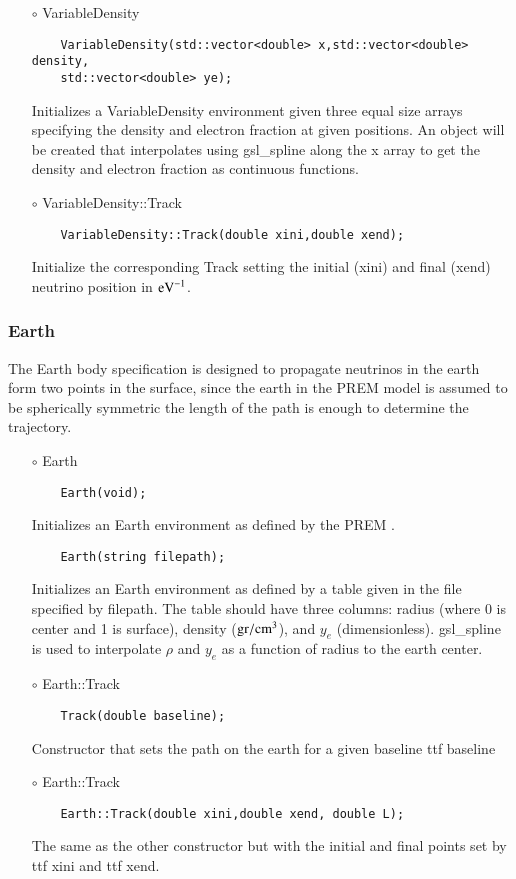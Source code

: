 \begin{itemize}
\item[$\circ$] {\ttf VariableDensity}
  \begin{lstlisting}
    VariableDensity(std::vector<double> x,std::vector<double> density,
    std::vector<double> ye);
  \end{lstlisting}
  Initializes a {\ttf VariableDensity} environment given three equal size arrays specifying the density and electron fraction at given positions. An object will be created that interpolates using {\ttfamily gsl\_spline} \citep{gough2009gnu} along the {\ttf x} array to get the density and electron fraction as continuous functions.
  \item[$\circ$] {\ttf VariableDensity::Track}
  \begin{lstlisting}
    VariableDensity::Track(double xini,double xend);
  \end{lstlisting}
  Initialize the corresponding {\ttf Track} setting the initial ({\ttf xini}) and final ({\ttf xend}) neutrino position in ${\rm eV}^{-1}$.
\end{itemize}

\subsubsection{Earth}
The {\ttf Earth} body specification is designed to propagate neutrinos
in the earth form two points in the surface, since the earth in the
PREM model is assumed to be spherically symmetric the length of the
path is enough to determine the trajectory. 
\begin{itemize}
\item[$\circ$] {\ttf Earth}
  \begin{lstlisting}
    Earth(void);
  \end{lstlisting}
  Initializes an {\ttf Earth} environment as defined by the PREM \citep{dziewonski1981preliminary}.
  \begin{lstlisting}
    Earth(string filepath);
  \end{lstlisting}
  Initializes an {\ttf Earth} environment as defined by a table given in the file specified by {\ttf filepath}. The table should have three columns: radius (where 0 is center and 1 is surface), density (${\rm gr}/{\rm cm}^3$), and $y_e$ (dimensionless). {\ttfamily gsl\_spline} \citep{gough2009gnu} is used to interpolate $\rho$ and $y_e$ as a function of radius to the earth center.
\item[$\circ$] {\ttf Earth::Track}
  \begin{lstlisting}
    Track(double baseline);
  \end{lstlisting}
  Constructor that sets the path on the earth for a given baseline
  {ttf baseline}
\item[$\circ$] {\ttf Earth::Track}
  \begin{lstlisting}
    Earth::Track(double xini,double xend, double L);
  \end{lstlisting}
  The same as the other constructor but with the initial and final points set by
  {ttf xini} and {ttf xend}.
\end{itemize}

